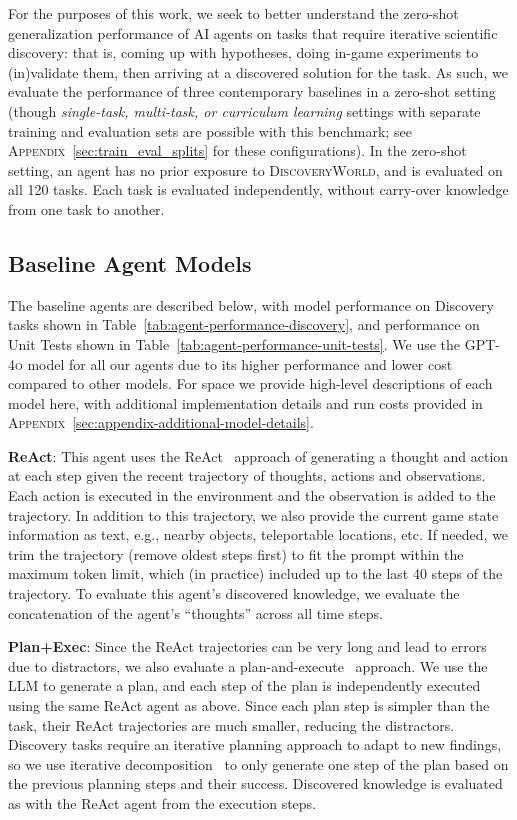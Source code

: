 \documentclass{article}
\newcommand{\env}{\textsc{DiscoveryWorld}\xspace}
\begin{document}
For the purposes of this work, we seek to better understand the zero-shot generalization performance of AI agents on tasks that require iterative scientific discovery: that is, coming up with hypotheses, doing in-game experiments to (in)validate them, then arriving at a discovered solution for the task.  As such, we evaluate the performance of three contemporary baselines in a zero-shot setting (though \textit{single-task, multi-task, or curriculum learning} settings with separate training and evaluation sets are possible with this benchmark; see \textsc{Appendix}~\ref{sec:train_eval_splits} for these configurations).  In the zero-shot setting, an agent has no prior exposure to \env, and is evaluated on all 120 tasks.  Each task is evaluated independently, without carry-over knowledge from one task to another. 



\subsection{Baseline Agent Models}

The baseline agents are described below, with model performance on Discovery tasks shown in Table~\ref{tab:agent-performance-discovery}, and performance on Unit Tests shown in Table~\ref{tab:agent-performance-unit-tests}. We use the \textsc{GPT-4o} model for all our agents due to its higher performance and lower cost compared to other models.  For space we provide high-level descriptions of each model here,  with additional implementation details and run costs provided in \textsc{Appendix}~\ref{sec:appendix-additional-model-details}. 

\textbf{ReAct}: This agent uses the ReAct~\cite{Yao2022ReActSR} approach of generating a thought and action at each step given the recent trajectory of thoughts, actions and observations. Each action is executed in the environment and the observation is added to the trajectory. In addition to this trajectory, we also provide the current game state information as text, e.g., nearby objects, teleportable locations, etc. If needed, we trim the trajectory (remove oldest steps first) to fit the prompt within the maximum token limit, which (in practice) included up to the last 40 steps of the trajectory. %
To evaluate this agent's discovered knowledge, we evaluate the concatenation of the agent's ``thoughts'' across all time steps.

\textbf{Plan+Exec}: Since the ReAct trajectories can be very long and lead to errors due to distractors, we also evaluate a plan-and-execute~\cite{wang-etal-2023-plan,intercode} approach. We use the LLM to generate a plan, and each step of the plan is independently executed using the same ReAct agent as above. Since each plan step is simpler than the task, their ReAct trajectories are much smaller, reducing the distractors.  Discovery tasks require an iterative planning approach to adapt to new findings, so we use iterative decomposition~\cite{decomp} to only generate one step of the plan based on the previous planning steps and their success. %
Discovered knowledge is evaluated as with the ReAct agent from the execution steps.
\end{document}
